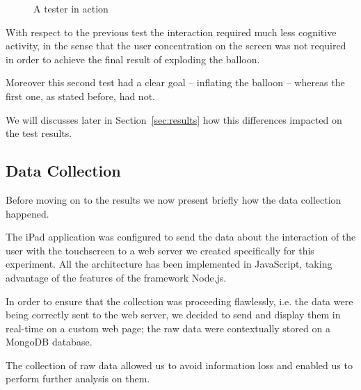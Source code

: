 \begin{figure}[h!t]
\label{fig:experiment}
\centering
	{\setlength{\fboxsep}{0pt}
	 }
\caption{A tester in action}
\end{figure}

With respect to the previous test the interaction required much less cognitive activity, in the sense that the user concentration on the screen was not required in order to achieve the final result of exploding the balloon.

Moreover this second test had a clear goal -- inflating the balloon -- whereas the first one, as stated before, had not.

We will discusses later in Section~\ref{sec:results} how this differences impacted on the test results.

\subsection{Data Collection}
Before moving on to the results we now present briefly how the data collection happened.

The iPad application was configured to send the data about the interaction of the user with the touchscreen to a web server we created specifically for this experiment. All the architecture has been implemented in JavaScript, taking advantage of the features of the framework Node.js.

In order to ensure that the collection was proceeding flawlessly, i.e. the data were being correctly sent to the web server, we decided to send and display them in real-time on a custom web page; the raw data were contextually stored on a MongoDB database.

The collection of raw data allowed us to avoid information loss and enabled us to perform further analysis on them.